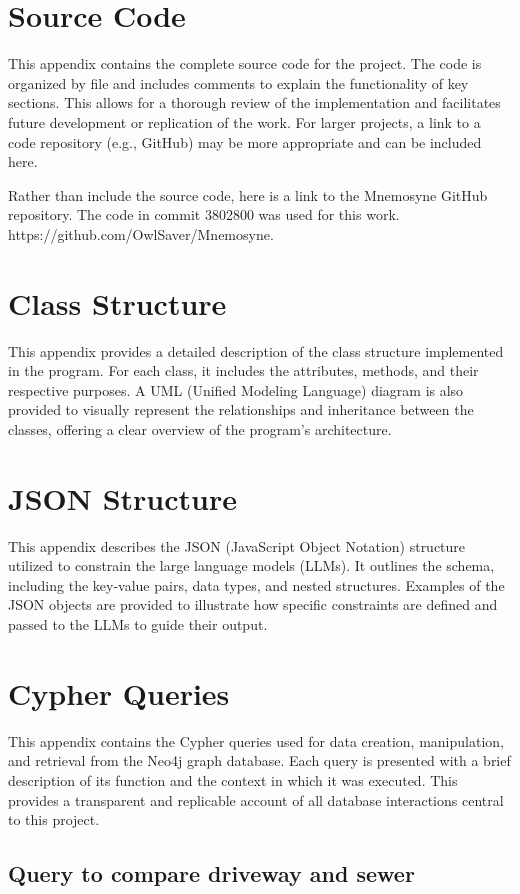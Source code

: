 \chapter{Source Code}
This appendix contains the complete source code for the project. The code is organized by file and includes comments to explain the functionality of key sections. This allows for a thorough review of the implementation and facilitates future development or replication of the work. For larger projects, a link to a code repository (e.g., GitHub) may be more appropriate and can be included here.

Rather than include the source code, here is a link to the Mnemosyne GitHub repository. The code in commit 3802800 was used for this work. https://github.com/OwlSaver/Mnemosyne.


\chapter{Class Structure}
This appendix provides a detailed description of the class structure implemented in the program. For each class, it includes the attributes, methods, and their respective purposes. A UML (Unified Modeling Language) diagram is also provided to visually represent the relationships and inheritance between the classes, offering a clear overview of the program's architecture.


\chapter{JSON Structure}
This appendix describes the JSON (JavaScript Object Notation) structure utilized to constrain the large language models (LLMs). It outlines the schema, including the key-value pairs, data types, and nested structures. Examples of the JSON objects are provided to illustrate how specific constraints are defined and passed to the LLMs to guide their output.

\chapter{Cypher Queries}
This appendix contains the Cypher queries used for data creation, manipulation, and retrieval from the Neo4j graph database. Each query is presented with a brief description of its function and the context in which it was executed. This provides a transparent and replicable account of all database interactions central to this project.

\section{Query to compare driveway and sewer}

